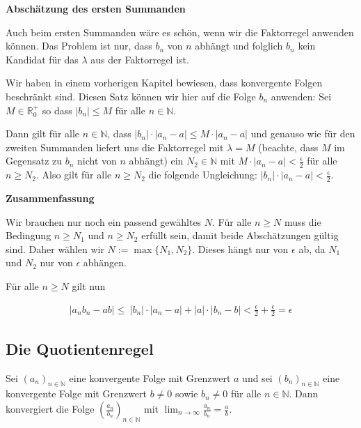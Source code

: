 \documentclass[fontsize=9pt,
               parskip=half-,
               DIV=14,
               listof=chapterentry,
               tocflat]{scrbook}
\begin{document}
\begin{proof*}
\textbf{Abschätzung des ersten Summanden}

Auch beim ersten Summanden wäre es schön, wenn wir die Faktorregel anwenden können. Das Problem ist nur, dass $b_{n}$ von $n$ abhängt und folglich $b_{n}$ kein Kandidat für das $\lambda $ aus der Faktorregel ist.

Wir haben in einem vorherigen Kapitel bewiesen, dass konvergente Folgen beschränkt sind. Diesen Satz können wir hier auf die Folge $b_{n}$ anwenden: Sei $M\in \mathbb {R} _{0}^{+}$ so dass $|b_{n}|\leq M$ für alle $n\in \mathbb {N} $.

Dann gilt für alle $n\in \mathbb {N} $, dass $|b_{n}|\cdot |a_{n}-a|\leq M\cdot |a_{n}-a|$ und genauso wie für den zweiten Summanden liefert uns die Faktorregel mit $\lambda =M$ (beachte, dass $M$ im Gegensatz zu $b_{n}$ nicht von $n$ abhängt) ein $N_{2}\in \mathbb {N} $ mit $M\cdot |a_{n}-a|<{\tfrac {\epsilon }{2}}$ für alle $n\geq N_{2}$. Also gilt für alle $n\geq N_{2}$ die folgende Ungleichung: $|b_{n}|\cdot |a_{n}-a|<{\tfrac {\epsilon }{2}}$.

\textbf{Zusammenfassung}

Wir brauchen nur noch ein passend gewähltes $N$. Für alle $n\geq N$ muss die Bedingung $n\geq N_{1}$ und $n\geq N_{2}$ erfüllt sein, damit beide Abschätzungen gültig sind. Daher wählen wir $N:=\max\{N_{1},N_{2}\}$. Dieses hängt nur von $\epsilon $ ab, da $N_{1}$ und $N_{2}$ nur von $\epsilon $ abhängen.

Für alle $n\geq N$ gilt nun

\begin{align*}
|a_{n}b_{n}-ab|\leq \ |b_{n}|\cdot |a_{n}-a|+|a|\cdot |b_{n}-b|<{\tfrac {\epsilon }{2}}+{\tfrac {\epsilon }{2}}=\epsilon 
\end{align*}

\end{proof*}

\subsection{Die Quotientenregel}

\begin{theorem*}
Sei $(a_{n})_{n\in \mathbb {N} }$ eine konvergente Folge mit Grenzwert $a$ und sei $(b_{n})_{n\in \mathbb {N} }$ eine konvergente Folge mit Grenzwert $b\neq 0$ sowie $b_{n}\neq 0$ für alle $n\in \mathbb {N} $. Dann konvergiert die Folge $({\tfrac {a_{n}}{b_{n}}})_{n\in \mathbb {N} }$ mit $\lim _{n\rightarrow \infty }{\tfrac {a_{n}}{b_{n}}}={\tfrac {a}{b}}$.

\end{theorem*}
\end{document}
